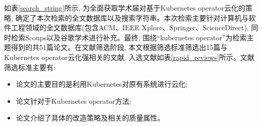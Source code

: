 如表\ref{search_string}所示, 为全面获取学术届对基于Kubernetes operator云化的策略, 确定了本次检索的全文数据库以及搜索字符串。本次检索主要针对计算机与软件工程领域的全文数据库\cite{lisboa2010systematic}(包含ACM、IEEE Xplore、Springer、ScienceDirect), 同时检索Scoups以及谷歌学术进行补充。最终, 围绕“kubernetes operator”为检索主题得到的共51篇论文。在文献筛选阶段, 本文根据筛选标准筛选出15篇与Kubernetes operator云化强相关的文献, 入选文献如表\ref{rapid_reviews}所示。文献筛选标准主要有:

\begin{itemize}[itemindent=2em]
    \item 论文的主要目的是利用Kubernetes对原有系统进行云化;

    \item 论文针对于Kubernetes operator方法;

    \item 论文介绍了具体的改造策略及相关的质量属性。
\end{itemize}

